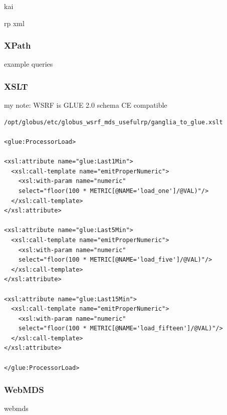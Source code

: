 kai

rp xml

\newpage
\subsubsection{XPath}
example queries
\subsubsection{XSLT}
my note: WSRF is GLUE 2.0 schema CE compatible
\begin{verbatim}
/opt/globus/etc/globus_wsrf_mds_usefulrp/ganglia_to_glue.xslt

<glue:ProcessorLoad>

<xsl:attribute name="glue:Last1Min">
  <xsl:call-template name="emitProperNumeric">
    <xsl:with-param name="numeric" 
    select="floor(100 * METRIC[@NAME='load_one']/@VAL)"/>
  </xsl:call-template>
</xsl:attribute>

<xsl:attribute name="glue:Last5Min">
  <xsl:call-template name="emitProperNumeric">
    <xsl:with-param name="numeric" 
    select="floor(100 * METRIC[@NAME='load_five']/@VAL)"/>
  </xsl:call-template>
</xsl:attribute>

<xsl:attribute name="glue:Last15Min">
  <xsl:call-template name="emitProperNumeric">
    <xsl:with-param name="numeric" 
    select="floor(100 * METRIC[@NAME='load_fifteen']/@VAL)"/>
  </xsl:call-template>
</xsl:attribute>

</glue:ProcessorLoad>
\end{verbatim}
\newpage

\subsubsection{WebMDS}
webmds
